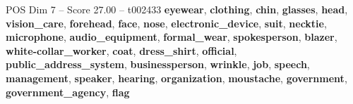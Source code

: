 \begin{textsample}{POS Dim 7 – Score 27.00 – t002433}  \label{ex:f7_pos_039}
\textbf{eyewear}, \textbf{clothing}, \textbf{chin}, \textbf{glasses}, \textbf{head}, \textbf{vision\_care}, \textbf{forehead}, \textbf{face}, \textbf{nose}, \textbf{electronic\_device}, \textbf{suit}, \textbf{necktie}, \textbf{microphone}, \textbf{audio\_equipment}, \textbf{formal\_wear}, \textbf{spokesperson}, \textbf{blazer}, \textbf{white-collar\_worker}, \textbf{coat}, \textbf{dress\_shirt}, \textbf{official}, \textbf{public\_address\_system}, \textbf{businessperson}, \textbf{wrinkle}, \textbf{job}, \textbf{speech}, \textbf{management}, \textbf{speaker}, \textbf{hearing}, \textbf{organization}, \textbf{moustache}, \textbf{government}, \textbf{government\_agency}, \textbf{flag}

\end{textsample}
